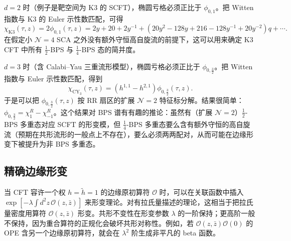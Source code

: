 $d=2$ 时（例子是靶空间为 K3 的 SCFT），椭圆亏格必须正比于 $\phi_{0,1}$。把 Witten 指数与 K3 的 Euler 示性数匹配，可得 \cite{r35}
\begin{equation}
  \label{eq:4-41}
  \chi_{\mathrm{K3}}(\tau,z)=2\phi_{0,1}(\tau,z)=2y+20+2y^{-1}+(20y^2-128y+216-128y^{-1}+20y^{-2})q+\cdots.
\end{equation}
在假定小 $\mathcal{N}=4$ SCA 之外没有额外守恒高自旋流的前提下，这可以用来确定 K3 CFT 中所有 $\frac12$-BPS 与 $\frac14$-BPS 态的简并度。


$d=3$ 时（含 Calabi--Yau 三重流形模型），椭圆亏格必须正比于 $\phi_{0,\frac32}$。把 Witten 指数与 Euler 示性数匹配，得到
\begin{equation}
  \label{eq:4-42}
  \chi_{\mathrm{CY}_3}(\tau,z)=(h^{1,1}-h^{2,1})\phi_{0,\frac32}(\tau,z).
\end{equation}
于是可以把 $\phi_{0,\frac32}(\tau,z)$ 按 RR 扇区的扩展 $\mathcal{N}=2$ 特征标分解。结果很简单：$\phi_{0,\frac32}=\chi^R_1-\chi^R_{-1}$。这个结果对 BPS 谱有有趣的推论：虽然有（扩展 $\mathcal{N}=2$）$\frac12$-BPS 多重态对应 SCFT 的形变模，但 $\frac14$-BPS 多重态要么含有额外守恒的高自旋流（预期在共形流形的一般点上不存在），要么必须两两配对，从而可能在边缘形变下被提升为非 BPS 多重态。


\subsection{精确边缘形变}

当 CFT 容许一个权 $h=\tilde h=1$ 的边缘原初算符 $\mathcal{O}$ 时，可以在关联函数中插入 $\exp[-\lambda\int d^2z\,\mathcal{O}(z,\bar z)]$ 来形变理论。对有拉氏量描述的理论，这相当于把拉氏量密度用算符 $\mathcal{O}(z,\bar z)$ 形变。共形不变性在形变参数 $\lambda$ 的一阶保持；更高阶一般不保持，因为重合算符的正规化会破坏共形对称性。例如，若 $\mathcal{O}(z,\bar z)\mathcal{O}(0)$ 的 OPE 含另一个边缘原初算符，就会在 $\lambda^2$ 阶生成非平凡的 beta 函数。

